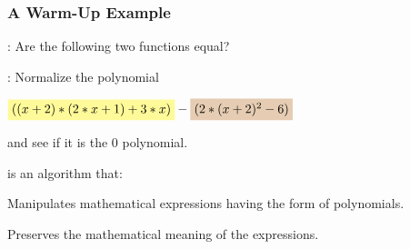\documentclass[t,12pt,numbers,fleqn]{beamer}
\begin{document}
\begin{frame}
\frametitle{A Warm-Up Example}
\bi

  \item {}: Are the following two functions equal?

  \bi

    \item[] 
    

    \item[] 


  \ei 


  \item<3-> : Normalize the polynomial 

  \bi

    \item[] $\colorbox{yellow!40}{$((x + 2) * (2 * x + 1) + 3 * x)$} -
      \colorbox{brown!40}{$(2* (x + 2)^2 - 6)$}$

  \ei

  and see if it is the 0 polynomial.

\pause

  \item<4->  is an algorithm that:

  \be

    \item Manipulates mathematical expressions having the form of
      polynomials.

    \item Preserves the mathematical meaning of the expressions.

  \ee

\ei
\end{frame}

\end{document}

